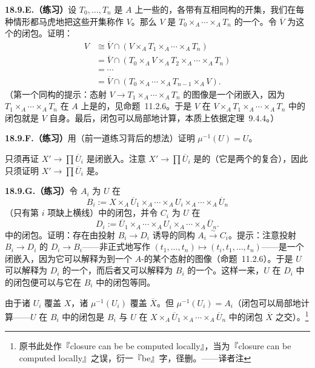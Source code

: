 \textbf{18.9.E.（练习）}\quad 设 $T_0,\dots,T_n$ 是 $A$ 上一些\emph{\trSeparated}的\trScheme，各带有互相同构的开集，我们在每种情形都马虎地把这些开集称作 $V$。那么 $V$ 是 $T_0\times_A\cdots\times_A T_n$ 的一个\trLocally\trClosed\trSubscheme。令 $\overline{V}$ 为这个\trLocally\trClosed\trSubscheme{}的闭包。证明：
\begin{align*}
V &\cong \overline{V}\cap(V\times_A T_1\times_A\cdots\times_A T_n)\\
 &= \overline{V}\cap(T_0\times_A V\times_A T_2\times_A\cdots\times_A T_n)\\
 &= \cdots\\
 &= \overline{V}\cap(T_0\times_A\cdots\times_A T_{n-1}\times_A V).
\end{align*}
（第一个同构的提示：态射 $V\to T_1\times_A\cdots\times_A T_n$ 的图像是一个闭嵌入，因为 $T_1\times_A\cdots\times_A T_n$ 在 $A$ 上是\trSeparated{}的，见\mbox{命题~11.2.6}。于是 $V$ 在 $V\times_A T_1\times_A\cdots\times_A T_n$ 中的\trSchemeTheoretic{}闭包就是 $V$ 自身。最后，\trSchemeTheoretic{}闭包可以局部地计算，本质上依据\mbox{定理~9.4.4}。）

\textbf{18.9.F.（练习）}\quad 用（前一道练习背后的想法）证明 $\mu^{-1}(U)=U$。

只须再证 $X'\to\prod\overline{U}_i$ 是闭嵌入。注意 $X'\to\prod\overline{U}_i$ 是\trClosed{}的（它是两个\trClosedMap{}的复合），因此只须证明 $X'\to\prod\overline{U}_i$ 是\trLocallyClosedEmbedding。

\textbf{18.9.G.（练习）}\quad 令 $A_i$ 为 $U$ 在
\[
B_i:=X\times_A\overline{U}_1\times_A\cdots\times_A U_i\times_A\cdots\times_A\overline{U}_n
\]
（只有第 $i$ 项缺上横线）中的闭包，并令 $C_i$ 为 $U$ 在
\[
D_i:=\overline{U}_1\times_A\cdots\times_A U_i\times_A\cdots\times_A\overline{U}_n.
\]
中的闭包。证明：存在由投射 $B_i\to D_i$ 诱导的同构 $A_i\xrightarrow{\sim}C_i$。提示：注意投射 $B_i\to D_i$ 的\trSection{} $D_i\to B_i$——非正式地写作 $(t_1,\dots,t_n)\mapsto(t_i,t_1,\dots,t_n)$——是一个闭嵌入，因为它可以解释为到一个\trSeparated{} $A$-\trScheme{}的某个态射的图像（\mbox{命题~11.2.6}）。于是 $U$ 可以解释为 $D_i$ 的一个\trLocally\trClosed\trSubscheme，而后者又可以解释为 $B_i$ 的一个\trClosedSubscheme。这样一来，$U$ 在 $D_i$ 中的闭包便可以与它在 $B_i$ 中的闭包等同。

由于诸 $U_i$ 覆盖 $X$，诸 $\mu^{-1}(U_i)$ 覆盖 $\overline{X}$。但 $\mu^{-1}(U_i)=A_i$（闭包可以局部地计算——$U$ 在 $B_i$ 中的闭包是 $B_i$ 与 $U$ 在 $X\times_A\overline{U}_1\times_A\cdots\times_A\overline{U}_n$ 中的闭包 $\overline{X}$ 之交）。\footnote{原书此处作『closure can be be computed locally』，当为『closure can be computed locally』之误，衍一『be』字，径删。——译者注}

